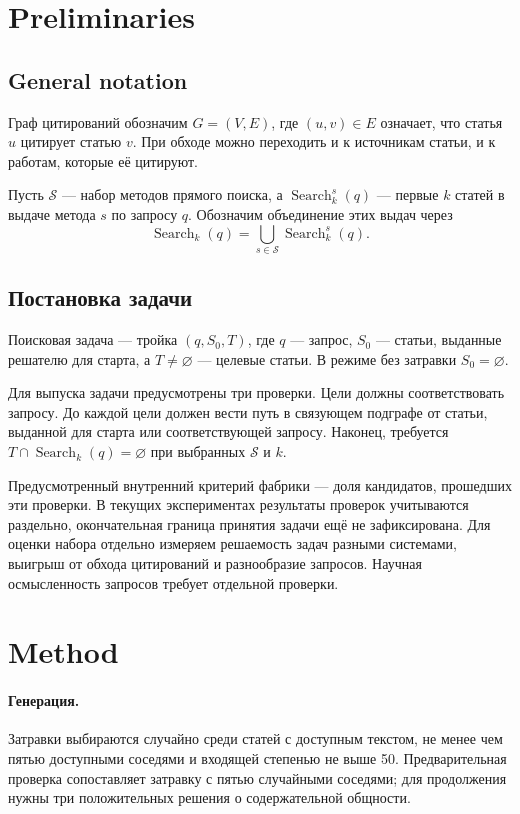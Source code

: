 \section{Preliminaries}\label{sec:prelim}

\subsection{General notation}

Граф цитирований обозначим $G=(V,E)$, где $(u,v)\in E$ означает, что статья $u$ цитирует статью $v$. При обходе можно переходить и к источникам статьи, и к работам, которые её цитируют.

Пусть $\mathcal{S}$ --- набор методов прямого поиска, а $\operatorname{Search}^{s}_{k}(q)$ --- первые $k$ статей в выдаче метода $s$ по запросу $q$. Обозначим объединение этих выдач через
\[
\operatorname{Search}_{k}(q)=\bigcup_{s\in\mathcal{S}}\operatorname{Search}^{s}_{k}(q).
\]

\subsection{Постановка задачи}

Поисковая задача --- тройка $(q,S_0,T)$, где $q$ --- запрос, $S_0$ --- статьи, выданные решателю для старта, а $T\ne\varnothing$ --- целевые статьи. В режиме без затравки $S_0=\varnothing$.

Для выпуска задачи предусмотрены три проверки. Цели должны соответствовать запросу. До каждой цели должен вести путь в связующем подграфе от статьи, выданной для старта или соответствующей запросу. Наконец, требуется $T\cap\operatorname{Search}_k(q)=\varnothing$ при выбранных $\mathcal{S}$ и $k$.

Предусмотренный внутренний критерий фабрики --- доля кандидатов, прошедших эти проверки. В текущих экспериментах результаты проверок учитываются раздельно, окончательная граница принятия задачи ещё не зафиксирована. Для оценки набора отдельно измеряем решаемость задач разными системами, выигрыш от обхода цитирований и разнообразие запросов. Научная осмысленность запросов требует отдельной проверки.

\section{Method}\label{sec:method}

\paragraph{Генерация.}
Затравки выбираются случайно среди статей с доступным текстом, не менее чем пятью доступными соседями и входящей степенью не выше 50. Предварительная проверка сопоставляет затравку с пятью случайными соседями; для продолжения нужны три положительных решения о содержательной общности.

